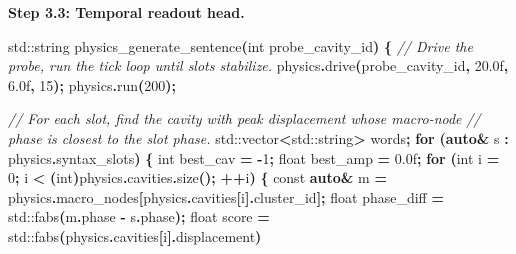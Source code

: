 \documentclass[
  11pt,
  a4paper,
]{article}
\newenvironment{Shaded}{\begin{snugshade}}{\end{snugshade}}
\newcommand{\AttributeTok}[1]{\textcolor[rgb]{0.13,0.29,0.53}{#1}}
\newcommand{\BuiltInTok}[1]{#1}
\newcommand{\CommentTok}[1]{\textcolor[rgb]{0.56,0.35,0.01}{\textit{#1}}}
\newcommand{\ControlFlowTok}[1]{\textcolor[rgb]{0.13,0.29,0.53}{\textbf{#1}}}
\newcommand{\DataTypeTok}[1]{\textcolor[rgb]{0.13,0.29,0.53}{#1}}
\newcommand{\DecValTok}[1]{\textcolor[rgb]{0.00,0.00,0.81}{#1}}
\newcommand{\FloatTok}[1]{\textcolor[rgb]{0.00,0.00,0.81}{#1}}
\newcommand{\KeywordTok}[1]{\textcolor[rgb]{0.13,0.29,0.53}{\textbf{#1}}}
\newcommand{\NormalTok}[1]{#1}
\newcommand{\OperatorTok}[1]{\textcolor[rgb]{0.81,0.36,0.00}{\textbf{#1}}}
\begin{document}
\textbf{Step 3.3: Temporal readout head.}

\begin{Shaded}
\begin{Highlighting}[]
\BuiltInTok{std::}\NormalTok{string physics\_generate\_sentence}\OperatorTok{(}\DataTypeTok{int}\NormalTok{ probe\_cavity\_id}\OperatorTok{)} \OperatorTok{\{}
    \CommentTok{// Drive the probe, run the tick loop until slots stabilize.}
\NormalTok{    physics}\OperatorTok{.}\NormalTok{drive}\OperatorTok{(}\NormalTok{probe\_cavity\_id}\OperatorTok{,} \FloatTok{20.0}\BuiltInTok{f}\OperatorTok{,} \FloatTok{6.0}\BuiltInTok{f}\OperatorTok{,} \DecValTok{15}\OperatorTok{);}
\NormalTok{    physics}\OperatorTok{.}\NormalTok{run}\OperatorTok{(}\DecValTok{200}\OperatorTok{);}

    \CommentTok{// For each slot, find the cavity with peak displacement whose macro{-}node}
    \CommentTok{// phase is closest to the slot phase.}
    \BuiltInTok{std::}\NormalTok{vector}\OperatorTok{\textless{}}\BuiltInTok{std::}\NormalTok{string}\OperatorTok{\textgreater{}}\NormalTok{ words}\OperatorTok{;}
    \ControlFlowTok{for} \OperatorTok{(}\KeywordTok{auto}\OperatorTok{\&}\NormalTok{ s }\OperatorTok{:}\NormalTok{ physics}\OperatorTok{.}\NormalTok{syntax\_slots}\OperatorTok{)} \OperatorTok{\{}
        \DataTypeTok{int}\NormalTok{   best\_cav }\OperatorTok{=} \OperatorTok{{-}}\DecValTok{1}\OperatorTok{;}
        \DataTypeTok{float}\NormalTok{ best\_amp }\OperatorTok{=} \FloatTok{0.0}\BuiltInTok{f}\OperatorTok{;}
        \ControlFlowTok{for} \OperatorTok{(}\DataTypeTok{int}\NormalTok{ i }\OperatorTok{=} \DecValTok{0}\OperatorTok{;}\NormalTok{ i }\OperatorTok{\textless{}} \OperatorTok{(}\DataTypeTok{int}\OperatorTok{)}\NormalTok{physics}\OperatorTok{.}\NormalTok{cavities}\OperatorTok{.}\NormalTok{size}\OperatorTok{();} \OperatorTok{++}\NormalTok{i}\OperatorTok{)} \OperatorTok{\{}
            \AttributeTok{const} \KeywordTok{auto}\OperatorTok{\&}\NormalTok{ m }\OperatorTok{=}\NormalTok{ physics}\OperatorTok{.}\NormalTok{macro\_nodes}\OperatorTok{[}\NormalTok{physics}\OperatorTok{.}\NormalTok{cavities}\OperatorTok{[}\NormalTok{i}\OperatorTok{].}\NormalTok{cluster\_id}\OperatorTok{];}
            \DataTypeTok{float}\NormalTok{ phase\_diff }\OperatorTok{=} \BuiltInTok{std::}\NormalTok{fabs}\OperatorTok{(}\NormalTok{m}\OperatorTok{.}\NormalTok{phase }\OperatorTok{{-}}\NormalTok{ s}\OperatorTok{.}\NormalTok{phase}\OperatorTok{);}
            \DataTypeTok{float}\NormalTok{ score }\OperatorTok{=} \BuiltInTok{std::}\NormalTok{fabs}\OperatorTok{(}\NormalTok{physics}\OperatorTok{.}\NormalTok{cavities}\OperatorTok{[}\NormalTok{i}\OperatorTok{].}\NormalTok{displacement}\OperatorTok{)}

\end{Highlighting}
\end{Shaded}
\end{document}
